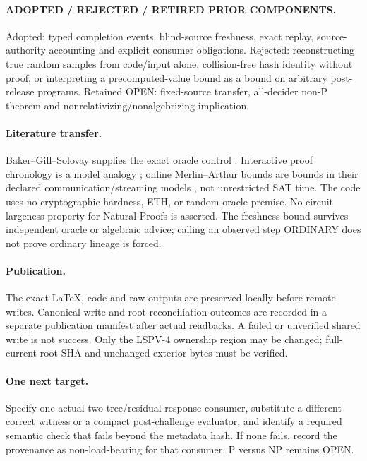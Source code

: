 \documentclass[11pt]{article}
\begin{document}
\paragraph{ADOPTED / REJECTED / RETIRED PRIOR COMPONENTS.}
Adopted: typed completion events, blind-source freshness, exact replay,
source-authority accounting and explicit consumer obligations. Rejected:
reconstructing true random samples from code/input alone, collision-free hash
identity without proof, or interpreting a precomputed-value bound as a bound
on arbitrary post-release programs. Retained OPEN: fixed-source transfer,
all-decider non-P theorem and nonrelativizing/nonalgebrizing implication.

\paragraph{Literature transfer.}
Baker--Gill--Solovay supplies the exact oracle control \cite{bgs}. Interactive
proof chronology is a model analogy \cite{gmr}; online Merlin--Arthur bounds
are bounds in their declared communication/streaming models \cite{gs}, not
unrestricted SAT time. The code uses no cryptographic hardness, ETH, or
random-oracle premise. No circuit largeness property for Natural Proofs is
asserted. The freshness bound survives independent oracle or algebraic advice;
calling an observed step ORDINARY does not prove ordinary lineage is forced.

\paragraph{Publication.}
The exact LaTeX, code and raw outputs are preserved locally before remote
writes. Canonical write and root-reconciliation outcomes are recorded in a
separate publication manifest after actual readbacks. A failed or unverified
shared write is not success. Only the LSPV-4 ownership region may be changed;
full-current-root SHA and unchanged exterior bytes must be verified.

\paragraph{One next target.}
Specify one actual two-tree/residual response consumer, substitute a different
correct witness or a compact post-challenge evaluator, and identify a required
semantic check that fails beyond the metadata hash. If none fails, record the
provenance as non-load-bearing for that consumer. P versus NP remains OPEN.
\end{document}
